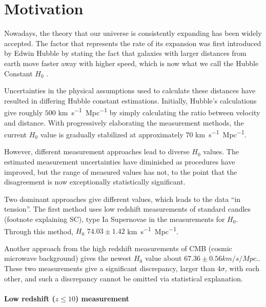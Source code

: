 \section{\label{sec:motiv}Motivation}
Nowadays, the theory that our universe is consistently expanding has been widely accepted. The factor that represents the rate of its expansion was first introduced by Edwin Hubble by stating the fact that galaxies with larger distances from earth move faster away with higher speed, which is now what we call the Hubble Constant $H_0$ \cite{Hubble_1929}. 

 Uncertainties in the physical assumptions used to calculate these distances have resulted in differing Hubble constant estimations. Initially, Hubble’s calculations give roughly $500$ \si{km.s^{-1}.Mpc^{-1}} by simply calculating the ratio between velocity and distance\cite{Hubble_1929}. With progressively elaborating the measurement methods, the current $H_0$ value is gradually stabilized at approximately $70$ \si{km.s^{-1}.Mpc^{-1}}.

However, different measurement approaches lead to diverse $H_0$ values. The estimated measurement uncertainties have diminished as procedures have improved, but the range of measured values has not, to the point that the disagreement is now exceptionally statistically significant.

Two dominant approaches give different values, which leads to the data “in tension”. The first method uses low redshift measurements of standard candles (footnote explaining SC), type Ia Supernovae in the measurements for $H_0$. Through this method, $H_0$  $74.03 \pm 1.42$ \si{km.s^{-1}.Mpc^{-1}}\cite{Riess_2019}.

Another approach from the high redshift measurements of CMB (cosmic microwave background) gives the newest $H_0$ value about $67.36 \pm 0.56km/s/Mpc$.\cite{Planck_2018}. These two measurements give a significant discrepancy, larger than $4 \sigma$, with each other, and such a discrepancy cannot be omitted via statistical explanation.


\paragraph{Low redshift ($z \leq 10$) measurement}

